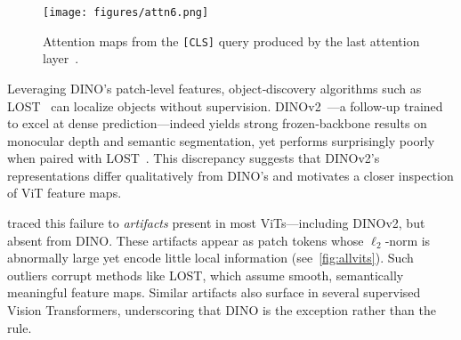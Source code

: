 \documentclass{article}
\newcommand{\citet}{\textcite}
\newcommand{\citep}{\parencite}
\begin{document}
\begin{figure}[h]
    \centering
    \texttt{[image: figures/attn6.png]}
    \caption{Attention maps from the \texttt{[CLS]} query produced by the last attention layer~\citep{caronEmergingPropertiesSelfsupervised2021}.}
    \label{fig:attn6}
\end{figure}

Leveraging DINO’s patch‑level features, object‑discovery algorithms such as LOST~\citep{simeoniLocalizingObjectsSelfsupervised2021} can localize objects without supervision.
DINOv2~\citep{oquabDINOv2LearningRobust2024}—a follow‑up trained to excel at dense prediction—indeed yields strong frozen‑backbone results on monocular depth and semantic segmentation, yet performs surprisingly poorly when paired with LOST~\citep{darcetVisionTransformersNeed2024}.
This discrepancy suggests that DINOv2’s representations differ qualitatively from DINO’s and motivates a closer inspection of ViT feature maps.

\citet{darcetVisionTransformersNeed2024} traced this failure to \emph{artifacts} present in most ViTs—including DINOv2, but absent from DINO. 
These artifacts appear as patch tokens whose $\ell_2$‑norm is abnormally large yet encode little local information (see~\cref{fig:allvits}). 
Such outliers corrupt methods like LOST, which assume smooth, semantically meaningful feature maps. 
Similar artifacts also surface in several supervised Vision Transformers, underscoring that DINO is the exception rather than the rule.
\end{document}
